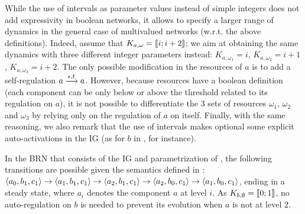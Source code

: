 While the use of intervals as parameter values instead of simple integers does not add expressivity in boolean networks,
it allows to specify a larger range of dynamics in the general case of multivalued networks (w.r.t. the above definitions).
Indeed, assume that $K_{a,\omega} = \llbracket i ; i+2 \rrbracket$;
we aim at obtaining the same dynamics with three different integer parameters instead: $K_{a,\omega_1} = i$,  $K_{a,\omega_2} = i+1$, $K_{a,\omega_3} = i+2$.
The only possible modification in the resources of $a$ is to add a self-regulation $a \xrightarrow{s, t} a$.
However, because resources have a boolean definition
(each component can be only below or above the threshold related to its regulation on $a$),
it is not possible to differentiate the 3 sets of resources $\omega_1$, $\omega_2$ and $\omega_3$
by relying only on the regulation of $a$ on itself.
Finally, with the same reasoning, we also remark that the use of intervals makes optional some explicit auto-activations in the IG
(as for $b$ in , for instance).

\begin{example*}
In the BRN that consists of the IG and parametrization of , the following
transitions are possible given the semantics defined in :
$\mbox{$\langle a_0, b_1, c_1 \rangle$} \rightarrow \mbox{$\langle a_1, b_1, c_1 \rangle$} \rightarrow \mbox{$\langle a_2, b_1, c_1 \rangle$} \rightarrow
\mbox{$\langle a_2, b_0, c_1 \rangle$} \rightarrow \mbox{$\langle a_1, b_0, c_1 \rangle$}$,
ending in a steady state,
where $a_i$ denotes the component $a$ at level $i$.
As $K_{b,\emptyset} = \llbracket 0 ; 1 \rrbracket$, no auto-regulation on $b$ is needed to prevent its evolution when $a$ is not at level $2$.
\end{example*}

